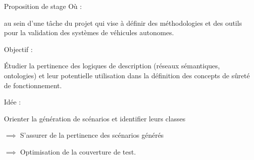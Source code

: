 \documentclass[
  hyperref={
    pdfusetitle,
    pdfencoding=auto,
    psdextra,
    colorlinks=true,
    linkcolor=darkblue,
    citecolor=darkred,
    urlcolor=darkblue,
  },
  9pt,
  aspectratio=169,
]{beamer}
\begin{document}
\begin{frame}{Proposition de stage}
  Où :

  au sein d'une tâche du projet 
  qui vise à définir des méthodologies et des outils
  pour la validation des systèmes de véhicules autonomes.

  \medskip

  Objectif :

  Étudier la pertinence des logiques de description
  (réseaux sémantiques, ontologies)
  et leur potentielle utilisation dans la définition des concepts
  de sûreté de fonctionnement.

  \medskip

  Idée :

  Orienter la génération de scénarios
  et identifier leurs classes

  \(\implies\) S'assurer de la pertinence des scénarios générés

  \(\implies\) Optimisation de la couverture de test.
\end{frame}

\end{document}
